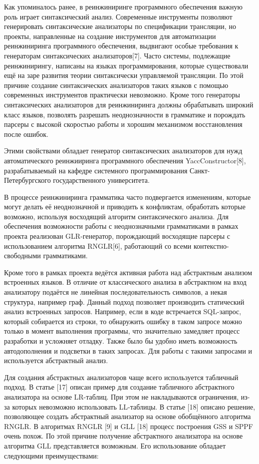 Как упоминалось ранее, в реинжиниринге программного обеспечения важную роль играет синтаксический анализ. Современные инструменты позволяют генерировать синтаксические анализаторы по спецификации трансляции, но проекты, направленные на создание инструментов для автоматизации реинжиниринга программного обеспечения, выдвигают особые требования к генераторам синтаксических анализаторов[7]. Часто системы, подлежащие реинжинирингу, написаны на языках программирования, которые существовали ещё на заре развития теории синтаксически управляемой трансляции. По этой причине создание синтаксических анализаторов таких языков с помощью современных инструментов практически невозможно. Кроме того генераторы синтаксических анализаторов для реинжиниринга должны обрабатывать широкий класс языков, позволять разрешать неоднозначности в грамматике и порождать парсеры с высокой скоростью работы и хорошим механизмом восстановления после ошибок.

Этими свойствами обладает генератор синтаксических анализаторов для нужд автоматического реинжииринга программного обеспечения YaccConstructor[8], разрабатываемый на кафедре системного программирования Санкт-Петербургского государственного университета.

В процессе реинжиниринга грамматика часто подвергается изменениям, которые могут делать её неоднозначной и приводить к конфликтам, обработать которые возможно, используя восходящий алгоритм синтаксического анализа. Для обеспечения возможности работы с неоднозначными грамматиками в рамках проекта реализован GLR-генератор, порождающий восходящие парсеры с использованием алгоритма RNGLR[6], работающий со всеми контекстно-свободными грамматиками.

Кроме того в рамках проекта ведётся активная работа над абстрактным анализом встроенных языков. В отличие от классического анализа в абстрактном на вход анализатору подаётся не линейная последовательность символов, а некая структура, например граф. Данный подход позволяет производить статический анализ встроенных запросов. Например, если в коде встречается SQL-запрос, который собирается из строки, то обнаружить ошибку в таком запросе можно только в момент выполнения программы, что значительно замедляет процесс разработки и усложняет отладку. Также было бы удобно иметь возможность автодополнения и подсветки в таких запросах. Для работы с такими запросами и используется абстрактный анализ. 


Для создания абстрактных анализаторов чаще всего используется табличный подход. В статье [17] описан пример для создание табличного абстрактного анализатора на основе LR-таблиц. При этом не накладываются ограничения, из-за которых невозможно использовать LL-таблицы. В статье [18] описано решение, позволяющее создать абстрактный анализатор на основе обобщённого алгоритма RNGLR. В алгоритмах RNGLR [9] и GLL [18] процесс построения GSS и SPPF очень похож. По этой причине получение абстрактного анализатора на основе алгоритма GLL  представляется возможным. Его использование обладает следующими преимуществами:

